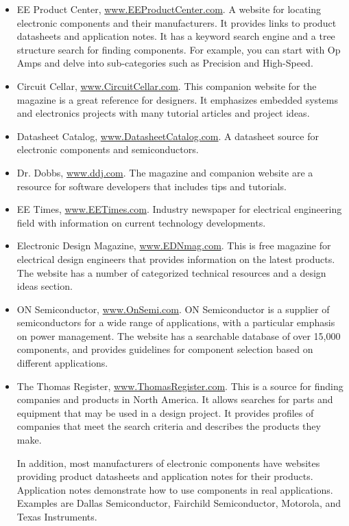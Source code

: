 \begin{itemize}
\item
  EE Product Center,
  \href{http://www.EEProductCenter.com}{www.EEProductCenter.com}. A
  website for locating electronic components and their manufacturers. It
  provides links to product datasheets and application notes. It has a
  keyword search engine and a tree structure search for finding
  components. For example, you can start with Op Amps and delve into
  sub-categories such as Precision and High-Speed.
\item
  Circuit Cellar,
  \href{http://www.CircuitCellar.com}{www.CircuitCellar.com}. This
  companion website for the magazine is a great reference for designers.
  It emphasizes embedded systems and electronics projects with many
  tutorial articles and project ideas.
\item
  Datasheet Catalog,
  \href{http://www.DatasheetCatalog.com}{www.DatasheetCatalog.com}. A
  datasheet source for electronic components and semiconductors.
\item
  Dr. Dobbs, \href{http://www.ddj.com}{www.ddj.com}. The magazine and
  companion website are a resource for software developers that includes
  tips and tutorials.
\item
  EE Times, \href{http://www.EETimes.com}{www.EETimes.com}. Industry
  newspaper for electrical engineering field with information on current
  technology developments.
\item
  Electronic Design Magazine,
  \href{http://www.EDNmag.com}{www.EDNmag.com}. This is free magazine
  for electrical design engineers that provides information on the
  latest products. The website has a number of categorized technical
  resources and a design ideas section.
\item
  ON Semiconductor, \href{http://www.OnSemi.com}{www.OnSemi.com}. ON
  Semiconductor is a supplier of semiconductors for a wide range of
  applications, with a particular emphasis on power management. The
  website has a searchable database of over 15,000 components, and
  provides guidelines for component selection based on different
  applications.
\item
  The Thomas Register,
  \href{http://www.ThomasRegister.com}{www.ThomasRegister.com}. This is
  a source for finding companies and products in North America. It
  allows searches for parts and equipment that may be used in a design
  project. It provides profiles of companies that meet the search
  criteria and describes the products they make.

  In addition, most manufacturers of electronic components have websites
  providing product datasheets and application notes for their products.
  Application notes demonstrate how to use components in real
  applications. Examples are Dallas Semiconductor, Fairchild
  Semiconductor, Motorola, and Texas Instruments.
\end{itemize}


